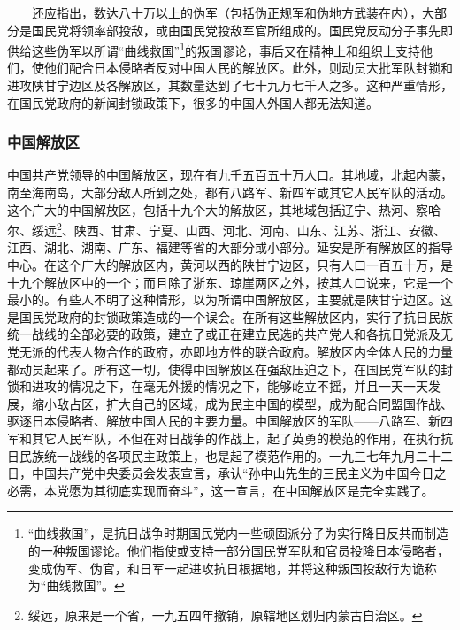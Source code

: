 \documentclass[cn,11pt,chinese]{elegantbook}
\def\myformat#1{\hfil\hfil #1}
\begin{document}
　　还应指出，数达八十万以上的伪军（包括伪正规军和伪地方武装在内），大部分是国民党将领率部投敌，或由国民党投敌军官所组成的。国民党反动分子事先即供给这些伪军以所谓“曲线救国”\footnote[9]{ “曲线救国”，是抗日战争时期国民党内一些顽固派分子为实行降日反共而制造的一种叛国谬论。他们指使或支持一部分国民党军队和官员投降日本侵略者，变成伪军、伪官，和日军一起进攻抗日根据地，并将这种叛国投敌行为诡称为“曲线救国”。}的叛国谬论，事后又在精神上和组织上支持他们，使他们配合日本侵略者反对中国人民的解放区。此外，则动员大批军队封锁和进攻陕甘宁边区及各解放区，其数量达到了七十九万七千人之多。这种严重情形，在国民党政府的新闻封锁政策下，很多的中国人外国人都无法知道。\\
\subsubsection*{\myformat{中国解放区}}
中国共产党领导的中国解放区，现在有九千五百五十万人口。其地域，北起内蒙，南至海南岛，大部分敌人所到之处，都有八路军、新四军或其它人民军队的活动。这个广大的中国解放区，包括十九个大的解放区，其地域包括辽宁、热河、察哈尔、绥远\footnote[10]{ 绥远，原来是一个省，一九五四年撤销，原辖地区划归内蒙古自治区。}、陕西、甘肃、宁夏、山西、河北、河南、山东、江苏、浙江、安徽、江西、湖北、湖南、广东、福建等省的大部分或小部分。延安是所有解放区的指导中心。在这个广大的解放区内，黄河以西的陕甘宁边区，只有人口一百五十万，是十九个解放区中的一个；而且除了浙东、琼崖两区之外，按其人口说来，它是一个最小的。有些人不明了这种情形，以为所谓中国解放区，主要就是陕甘宁边区。这是国民党政府的封锁政策造成的一个误会。在所有这些解放区内，实行了抗日民族统一战线的全部必要的政策，建立了或正在建立民选的共产党人和各抗日党派及无党无派的代表人物合作的政府，亦即地方性的联合政府。解放区内全体人民的力量都动员起来了。所有这一切，使得中国解放区在强敌压迫之下，在国民党军队的封锁和进攻的情况之下，在毫无外援的情况之下，能够屹立不摇，并且一天一天发展，缩小敌占区，扩大自己的区域，成为民主中国的模型，成为配合同盟国作战、驱逐日本侵略者、解放中国人民的主要力量。中国解放区的军队——八路军、新四军和其它人民军队，不但在对日战争的作战上，起了英勇的模范的作用，在执行抗日民族统一战线的各项民主政策上，也是起了模范作用的。一九三七年九月二十二日，中国共产党中央委员会发表宣言，承认“孙中山先生的三民主义为中国今日之必需，本党愿为其彻底实现而奋斗”，这一宣言，在中国解放区是完全实践了。\\
\end{document}
